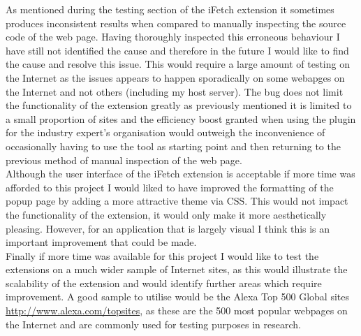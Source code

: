 \documentclass[12pt]{article}
\begin{document}
As mentioned during the testing section of the iFetch extension it sometimes produces inconsistent results when compared to manually inspecting the source code of the web page. Having thoroughly inspected this erroneous behaviour I have still not identified the cause and therefore in the future I would like to find the cause and resolve this issue. This would require a large amount of testing on the Internet as the issues appears to happen sporadically on some webapges on the Internet and not others (including my host server). The bug does not limit the functionality of the extension greatly as previously mentioned it is limited to a small proportion of sites and the efficiency boost granted when using the plugin for the industry expert's organisation would outweigh the inconvenience of occasionally having to use the tool as starting point and then returning to the previous method of manual inspection of the web page. \\  

Although the user interface of the iFetch extension is acceptable if more time was afforded to this project I would liked to have improved the formatting of the popup page by adding a more attractive theme via CSS. This would not impact the functionality of the extension, it would only make it more aesthetically pleasing. However, for an application that is largely visual I think this is an important improvement that could be made. \\

Finally if more time was available for this project I would like to test the extensions on a much wider sample of Internet sites, as this would illustrate the scalability of the extension and would identify further areas which require improvement. A good sample to utilise would be the Alexa Top 500 Global sites \url{http://www.alexa.com/topsites}, as these are the 500 most popular webpages on the Internet and are commonly used for testing purposes in research.  

\pagebreak
\end{document}
